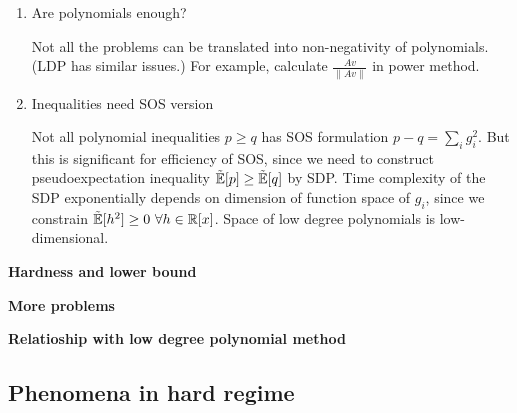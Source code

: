\begin{enumerate}
    \item Are polynomials enough?

    Not all the problems can be translated into non-negativity of polynomials. (LDP has similar issues.) For example, calculate $\frac{Av}{\|Av\|}$ in power method.
    
    \item Inequalities need SOS version
    
    Not all polynomial inequalities $p\ge q$ has SOS formulation $p-q=\sum_i g_i^2$. But this is significant for efficiency of SOS, since we need to construct pseudoexpectation inequality $\tilde{\mathbb{E}}[p]\ge \tilde{\mathbb{E}}[q]$ by SDP. 
    Time complexity of the SDP exponentially depends on dimension of function space of $g_i$, since we constrain $\tilde{\mathbb{E}}[h^2]\ge 0~\forall h\in\mathbb{R}[x]$. Space of low degree polynomials is low-dimensional.

\end{enumerate}

\bigskip

\textbf{Hardness and lower bound}


\bigskip

\textbf{More problems}


\bigskip




\textbf{Relatioship with low degree polynomial method}







\subsection{Phenomena in hard regime}